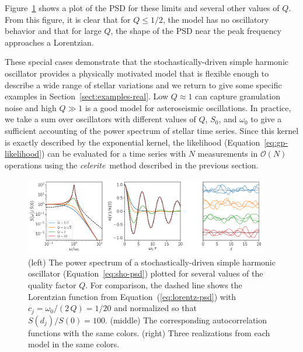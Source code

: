 \documentclass[manuscript, letterpaper]{aastex6}
\makeatletter
\let\origsection\section
\renewcommand\section{\@ifstar{\starsection}{\nostarsection}}
\newcommand\nostarsection[1]{\sectionprelude\origsection{#1}}
\newcommand\starsection[1]{\sectionprelude\origsection*{#1}}
\newcommand\sectionprelude{\vspace{1em}}
\newcommand{\celeriteterm}{\emph{celerite}}
\newcommand{\figureref}[1]{\ref{fig:#1}}
\newcommand{\Figure}[1]{Figure~\figureref{#1}}
\newcommand{\figurelabel}[1]{\label{fig:#1}}
\renewcommand{\eqref}[1]{\ref{eq:#1}}
\newcommand{\Eq}[1]{Equation~(\eqref{#1})}
\newcommand{\eq}[1]{\Eq{#1}}
\newcommand{\eqalt}[1]{Equation~\eqref{#1}}
\newcommand{\sectionname}{Section}
\newcommand{\sectref}[1]{\ref{sect:#1}}
\newcommand{\Sect}[1]{\sectionname~\sectref{#1}}
\newcommand{\sect}[1]{\Sect{#1}}
\newcommand{\response}[1]{{\color{blue}#1}}
\makeatother
\begin{document}
\Figure{sho} shows a plot of the PSD for these limits and several other values
of $Q$.
From this figure, it is clear that for $Q \le 1/2$, the model has no
oscillatory behavior and that for large $Q$, the shape of the PSD near the
peak frequency approaches a Lorentzian.

These special cases demonstrate that the stochastically-driven simple harmonic
oscillator provides a physically motivated model that is flexible enough to
describe a wide range of stellar variations and we return to give some
specific examples in \sect{examples-real}.
Low $Q \approx 1$ can capture granulation noise and high $Q \gg 1$ is a good
model for asteroseismic oscillations.
In practice, we take a sum over oscillators with different values of $Q$,
$S_0$, and $\omega_0$ to give a sufficient accounting of the power spectrum
of stellar time series.
Since this kernel is exactly described by the exponential kernel, the
likelihood (\eqalt{gp-likelihood}) can be evaluated for a time series with $N$
measurements in $\mathcal{O}(N)$ operations using the \celeriteterm\ method
described in the previous section.

\begin{figure}[!htbp]
\begin{center}
\includegraphics[width=0.95\textwidth]{figures/sho.pdf}
\caption{(left) The power spectrum of a stochastically-driven simple harmonic
    oscillator (\eqalt{sho-psd}) plotted for several values of the quality
    factor $Q$.
    For comparison, the dashed line shows the Lorentzian function from
    \eq{lorentz-psd} with $c_j = \omega_0/(2\,Q) = 1/20$ and normalized so that
    $S(d_j)/S(0) = 100$.
    (middle) The corresponding autocorrelation functions with the same colors.
    \response{(right) Three realizations from each model in the same colors.}
    \figurelabel{sho}}
\end{center}
\end{figure}


\section{Examples with simulated data}
\end{document}
